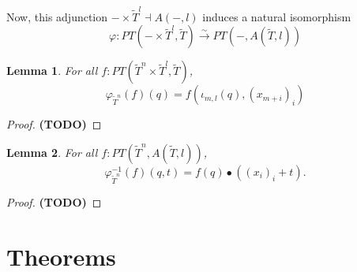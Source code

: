 \documentclass[a4paper]{amsbook}
\newtheorem{lemma}{Lemma}
\theoremstyle{definition}
\theoremstyle{remark}
\newcommand\TODO{\textbf{(TODO)} }
\begin{document}
  Now, this adjunction $ - \times \tilde T^l \dashv A(-, l) $ induces a natural isomorphism
  \[ \varphi: PT(- \times \tilde T^l, \tilde T) \xrightarrow{\sim} PT(-, A(\tilde T, l)) \]
  \begin{lemma}
    For all $ f: PT(\tilde T^n \times \tilde T^l, \tilde T) $,
    \[ \varphi_{\tilde T^n}(f)(q) = f(\iota_{m, l}(q), (x_{m + i})_i) \]
  \end{lemma}
  \begin{proof}
    \TODO
  \end{proof}

  \begin{lemma}
    For all $ f: PT(\tilde T^n, A(\tilde T, l)) $,
    \[ \varphi_{\tilde T^n}^{-1}(f)(q, t) = f(q) \bullet ((x_i)_i + t). \]
  \end{lemma}
  \begin{proof}
    \TODO
  \end{proof}

  \chapter{Theorems}
\end{document}
